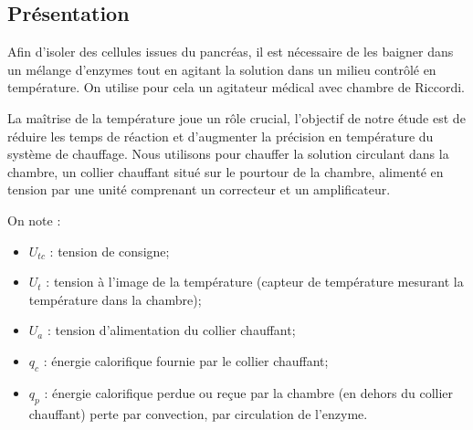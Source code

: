 \setcounter{exo}{0}
\begin{multicols}{2}

\subsection*{Présentation}


Afin d'isoler des cellules issues du pancréas, il est nécessaire de les baigner dans un mélange d'enzymes tout en agitant la solution dans un milieu contrôlé en température. On utilise pour cela 
un agitateur médical avec chambre de Riccordi.


La maîtrise de la température joue un rôle crucial, l’objectif de notre étude est de réduire les temps
de réaction et d’augmenter la précision en température du système de chauffage.
Nous utilisons pour chauffer la solution circulant dans la chambre, un collier chauffant situé sur le
pourtour de la chambre, alimenté en tension par une unité comprenant un correcteur et un
amplificateur.




On note : 
\begin{itemize}
\item $U_{tc}$ : tension de consigne;
\item $U_t$ : tension à l'image de la température (capteur de température mesurant la température dans la chambre);
\item $U_a$ : tension d'alimentation du collier chauffant;
\item $q_c$ : énergie calorifique fournie par le collier chauffant;
\item $q_p$ : énergie calorifique perdue ou reçue par la chambre (en dehors du collier chauffant) perte par convection, par circulation de l'enzyme.
\end{itemize}


\end{multicols}
